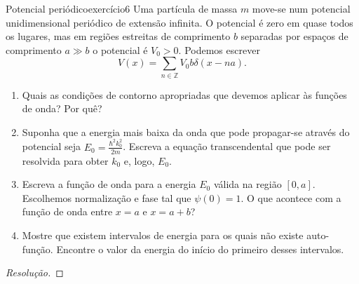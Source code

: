 \begin{exercício}{Potencial periódico}{exercício6}
    Uma partícula de massa \(m\) move-se num potencial unidimensional periódico de extensão infinita. O potencial é zero em quase todos os lugares, mas em regiões estreitas de comprimento \(b\) separadas por espaços de comprimento \(a \gg b\) o potencial é \(V_0 > 0\). Podemos escrever
    \begin{equation*}
        V(x) = \sum_{n \in \mathbb{Z}} V_0 b \delta(x - na).
    \end{equation*}
    \begin{enumerate}[label=(\alph*)]
        \item Quais as condições de contorno apropriadas que devemos aplicar às funções de onda? Por quê?
        \item Suponha que a energia mais baixa da onda que pode propagar-se através do potencial seja \(E_0 = \frac{\hbar^2 k_0^2}{2m}\). Escreva a equação transcendental que pode ser resolvida para obter \(k_0\) e, logo, \(E_0\).
        \item Escreva a função de onda para a energia \(E_0\) válida na região \([0,a]\). Escolhemos normalização e fase tal que \(\psi(0) = 1\). O que acontece com a função de onda entre \(x = a\) e \(x = a+b\)?
        \item Mostre que existem intervalos de energia para os quais não existe auto-função. Encontre o valor da energia do início do primeiro desses intervalos.
    \end{enumerate}
\end{exercício}
\begin{proof}[Resolução]

\end{proof}
